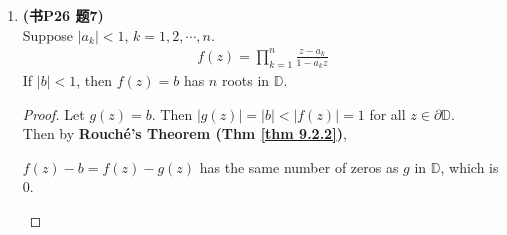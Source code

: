 \begin{enumerate}
		\newpage
		
		\item \textbf{(书P26 题7)} \\
		Suppose $\left| a_k \right| < 1$, $k = 1 , 2 , \cdots , n$.
		\begin{align}
			f(z) = \prod_{k = 1}^{n}{\frac{z - a_k}{1 - \overline{a_k}z}}
		\end{align}
		If $\left| b \right| < 1$, then $f(z) = b$ has $n$ roots in $\mathbb{D}$.
		
		\vspace{2em}
		\begin{proof}
			Let $g(z) = b$. Then $\left| g(z) \right| = \left| b \right| < \left| f(z) \right| = 1$ for all $z \in \partial \mathbb{D}$. \\
			Then by \textbf{Rouch\'{e}'s Theorem (Thm \ref{thm 9.2.2})},
			\begin{center}
				$f(z) - b = f(z) - g(z)$ has the same number of zeros as $g$ in $\mathbb{D}$, which is 0.
			\end{center}
		\end{proof}
	\end{enumerate}
	






	\ifx\allfiles\undefined

\fi